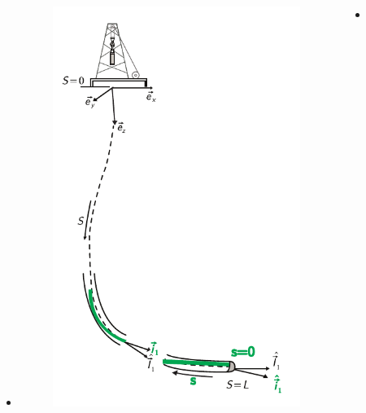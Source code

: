 \documentclass{beamer}
\begin{document}
\begin{frame}
\begin{columns}[T]
\begin{column}{0.5\textwidth}
\begin{itemize}
			\item <2|only@2> [] \vspace{3pt}\begin{figure}[ht]\centering
				\includegraphics[width=1\textwidth]{images/geodescb.pdf}
			\end{figure}
			\end{itemize}
		\end{column}
		\begin{column}{0.5\textwidth}
			\begin{itemize}
				\item <1|only@1> [] \begin{figure}\centering

\end{figure}
\end{itemize}
\end{column}
\end{columns}
\end{frame}
\end{document}
